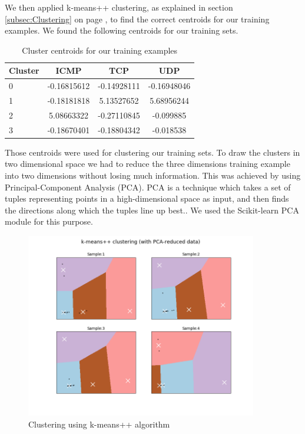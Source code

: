 \documentclass[12pt,oneside,a4paper]{article}
\begin{document}
We then applied k-means++ clustering, as explained in section \ref{subsec:Clustering} on page \pageref{subsec:Clustering}, to find the correct centroids for our training examples. We found the following centroids for our training sets.

\begin{table}[H]
\centering
  \begin{tabular}{ l | c  c  c }
    Cluster      & ICMP  & TCP  & UDP \\
    \hline
    0         &{-0.16815612}       &{-0.14928111}    &{-0.16948046} \\
    1         &{-0.18181818}       &{5.13527652}     &{5.68956244} \\
    2         &{5.08663322}        &{-0.27110845}    &{-0.099885} \\
    3         &{-0.18670401}       &{-0.18804342}    &{-0.018538} \\
  \end{tabular}
\caption{Cluster centroids for our training examples} \label{table:centroids}
\end{table}

Those centroids were used for clustering our training sets. To draw the clusters in two dimensional space we had to reduce the three dimensions training example into two dimensions without losing much information. This was achieved by using Principal-Component Analysis (PCA). PCA is a technique which takes a set of tuples representing points in a high-dimensional space as input, and then finds the directions along which the tuples line up best.\cite{pca}. We used the Scikit-learn PCA module for this purpose.

\begin{figure}[H]
\centering
\includegraphics[width=0.90\textwidth]{kemans-clustering.png}
\caption{Clustering using k-means++ algorithm} \label{fig:k-means-clustering}
\end{figure}
\end{document}
